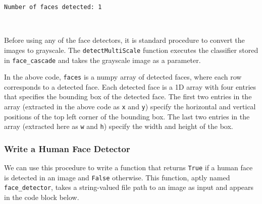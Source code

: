 \documentclass[11pt]{article}
\begin{document}
    \begin{Verbatim}[commandchars=\\\{\}]
Number of faces detected: 1

    \end{Verbatim}

    \begin{center}
    \end{center}
    { \hspace*{\fill} \\}
    
    Before using any of the face detectors, it is standard procedure to
convert the images to grayscale. The \texttt{detectMultiScale} function
executes the classifier stored in \texttt{face\_cascade} and takes the
grayscale image as a parameter.

In the above code, \texttt{faces} is a numpy array of detected faces,
where each row corresponds to a detected face. Each detected face is a
1D array with four entries that specifies the bounding box of the
detected face. The first two entries in the array (extracted in the
above code as \texttt{x} and \texttt{y}) specify the horizontal and
vertical positions of the top left corner of the bounding box. The last
two entries in the array (extracted here as \texttt{w} and \texttt{h})
specify the width and height of the box.

\subsubsection{Write a Human Face
Detector}\label{write-a-human-face-detector}

We can use this procedure to write a function that returns \texttt{True}
if a human face is detected in an image and \texttt{False} otherwise.
This function, aptly named \texttt{face\_detector}, takes a
string-valued file path to an image as input and appears in the code
block below.
\end{document}
